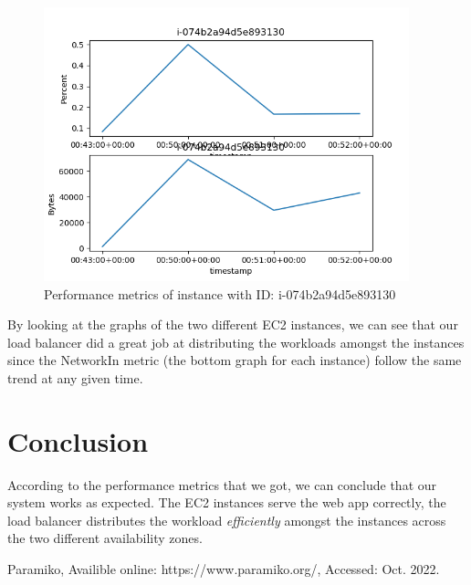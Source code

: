 \documentclass[12pt]{article}
\begin{document}
\begin{figure}[htbp]
\centering
  \includegraphics[height=300px]{i-074b2a94d5e893130.png}
  \caption{Performance metrics of instance with ID: i-074b2a94d5e893130}
\end{figure}

By looking at the graphs of the two different EC2 instances, we can see that our load balancer did a great job at distributing the workloads amongst the instances since the NetworkIn metric (the bottom graph for each instance) follow the same trend at any given time.

\section{Conclusion}

According to the performance metrics that we got, we can conclude that our system works as expected. The EC2 instances serve the web app correctly, the load balancer distributes the workload \emph{efficiently} amongst the instances across the two different availability zones.

\begin{thebibliography}{9}
Paramiko, Availible online: https://www.paramiko.org/, Accessed: Oct. 2022. 
\end{thebibliography}
\end{document}
